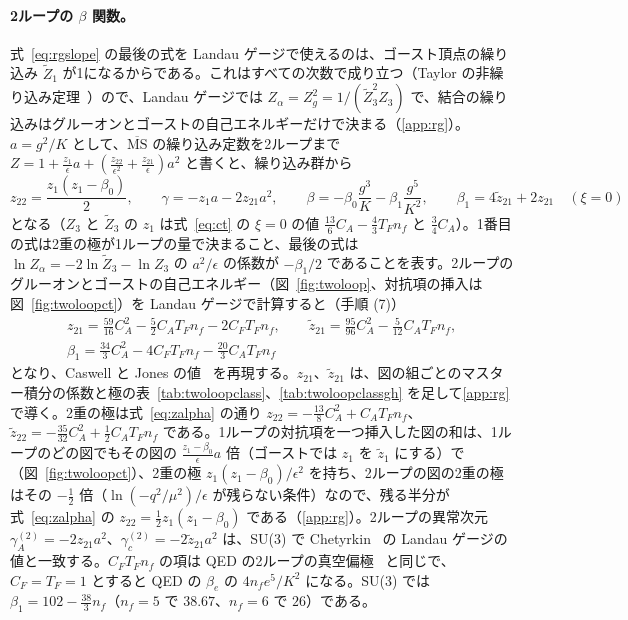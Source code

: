 \documentclass[a4paper,10pt]{ltjsarticle}
\newcommand{\MSbar}{\overline{\mathrm{MS}}}
\begin{document}
\paragraph{2ループの $\beta$ 関数。}式~\eqref{eq:rgslope} の最後の式を Landau ゲージで使えるのは、ゴースト頂点の繰り込み $\tilde Z_1$ が1になるからである。これはすべての次数で成り立つ（Taylor の非繰り込み定理~\cite{taylor}）ので、Landau ゲージでは $Z_\alpha=Z_g^2=1/(\tilde Z_3^2Z_3)$ で、結合の繰り込みはグルーオンとゴーストの自己エネルギーだけで決まる（\ref{app:rg}）。$a=g^2/K$ として、$\MSbar$ の繰り込み定数を2ループまで $Z=1+\frac{z_1}{\epsilon}a+(\frac{z_{22}}{\epsilon^2}+\frac{z_{21}}{\epsilon})a^2$ と書くと、繰り込み群から
\begin{equation}
z_{22}=\frac{z_1(z_1-\beta_0)}2,\qquad \gamma=-z_1a-2z_{21}a^2,\qquad
\beta=-\beta_0\frac{g^3}K-\beta_1\frac{g^5}{K^2},\qquad \beta_1=4\tilde z_{21}+2z_{21}\quad(\xi=0)
\label{eq:zalpha}
\end{equation}
となる（$Z_3$ と $\tilde Z_3$ の $z_1$ は式~\eqref{eq:ct} の $\xi=0$ の値 $\frac{13}6C_A-\frac43T_Fn_f$ と $\frac34C_A$）。1番目の式は2重の極が1ループの量で決まること、最後の式は $\ln Z_\alpha=-2\ln\tilde Z_3-\ln Z_3$ の $a^2/\epsilon$ の係数が $-\beta_1/2$ であることを表す。2ループのグルーオンとゴーストの自己エネルギー（図~\ref{fig:twoloop}、対抗項の挿入は図~\ref{fig:twoloopct}）を Landau ゲージで計算すると（手順 (7)）
\begin{equation}
\begin{gathered}
z_{21}=\frac{59}{16}C_A^2-\frac52C_AT_Fn_f-2C_FT_Fn_f,\qquad
\tilde z_{21}=\frac{95}{96}C_A^2-\frac5{12}C_AT_Fn_f,\\
\beta_1=\frac{34}3C_A^2-4C_FT_Fn_f-\frac{20}3C_AT_Fn_f
\end{gathered}
\label{eq:z2}
\end{equation}
となり、Caswell と Jones の値~\cite{caswell74,jones74} を再現する。$z_{21}$、$\tilde z_{21}$ は、図の組ごとのマスター積分の係数と極の表~\ref{tab:twoloopclass}、\ref{tab:twoloopclassgh} を足して\ref{app:rg} で導く。2重の極は式~\eqref{eq:zalpha} の通り $z_{22}=-\frac{13}8C_A^2+C_AT_Fn_f$、$\tilde z_{22}=-\frac{35}{32}C_A^2+\frac12C_AT_Fn_f$ である。1ループの対抗項を一つ挿入した図の和は、1ループのどの図でもその図の $\frac{z_1-\beta_0}\epsilon a$ 倍（ゴーストでは $z_1$ を $\tilde z_1$ にする）で（図~\ref{fig:twoloopct}）、2重の極 $z_1(z_1-\beta_0)/\epsilon^2$ を持ち、2ループの図の2重の極はその $-\frac12$ 倍（$\ln(-q^2/\mu^2)/\epsilon$ が残らない条件）なので、残る半分が式~\eqref{eq:zalpha} の $z_{22}=\frac12z_1(z_1-\beta_0)$ である（\ref{app:rg}）。2ループの異常次元 $\gamma_A^{(2)}=-2z_{21}a^2$、$\gamma_c^{(2)}=-2\tilde z_{21}a^2$ は、SU(3) で Chetyrkin~\cite{chetyrkin05} の Landau ゲージの値と一致する。$C_FT_Fn_f$ の項は QED の2ループの真空偏極~\cite{jl50} と同じで、$C_F=T_F=1$ とすると QED の $\beta_e$ の $4n_fe^5/K^2$ になる。SU(3) では $\beta_1=102-\frac{38}3n_f$（$n_f=5$ で $38.67$、$n_f=6$ で $26$）である。
\end{document}
